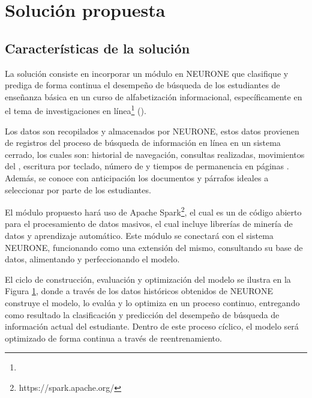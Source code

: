 \section{Solución propuesta}
\label{sec:solucion_propuesta}

\subsection{Características de la solución}
\label{subsec:caracteristicas-solucion}
La solución consiste en incorporar un módulo en NEURONE \parencite{gonzalez2017neurone} que clasifique y prediga de forma continua el desempeño de búsqueda de los estudiantes de enseñanza básica en un curso de alfabetización informacional, específicamente en el tema de investigaciones en línea\footnote{\traduccionlibre} (). 

Los datos son recopilados y almacenados por NEURONE, estos datos provienen de registros del proceso de búsqueda de información en línea en un sistema cerrado, los cuales son: historial de navegación, consultas realizadas, movimientos del , escritura por teclado, número de  y tiempos de permanencia en páginas . Además, se conoce con anticipación los documentos y párrafos ideales a seleccionar por parte de los estudiantes.

El módulo propuesto hará uso de Apache Spark\footnote{https://spark.apache.org/}, el cual es un  de código abierto para el procesamiento de datos masivos, el cual incluye librerías de minería de datos y aprendizaje automático. Este módulo se conectará con el sistema NEURONE, funcionando como una extensión del mismo, consultando su base de datos, alimentando y perfeccionando el modelo. 

El ciclo de construcción, evaluación y optimización del modelo se ilustra en la Figura \ref{fig:ml-pipeline}, donde a través de los datos históricos obtenidos de NEURONE construye el modelo, lo evalúa y lo optimiza en un proceso continuo, entregando como resultado la clasificación y predicción del desempeño de búsqueda de información actual del estudiante. Dentro de este proceso cíclico, el modelo será optimizado de forma continua a través de reentrenamiento.

\begin{figure}[H]
	\centering
	\scalebox{0.8}{}
	\label{fig:ml-pipeline}
\end{figure}

